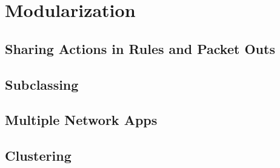 \chapter{Modularization}

\section{Sharing Actions in Rules and Packet Outs}
 \label{modularization:sharing_predicates}

\section{Subclassing}

\section{Multiple Network Apps}

\section{Clustering}

